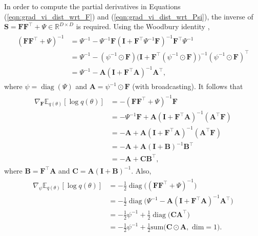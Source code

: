 \documentclass[msc,deptreport.inf]{infthesis} %
\newcommand{\matr}[1]{\mathbf{#1}}
\newcommand{\R}{\mathbb R}
\newcommand{\E}{\mathbb E}
\newcommand{\diag}{\mathop{\mathrm{diag}}}
\begin{document}
In order to compute the partial derivatives in Equations (\ref{eqn:grad_vi_dist_wrt_F}) and (\ref{eqn:grad_vi_dist_wrt_Psi}), the inverse of $\matr{S} = \matr{FF}^{\intercal} + \Psi \in \R^{D \times D}$ is required. Using the Woodbury identity \cite{petersen2012},
\begin{align}
\begin{split}
	( \matr{FF}^{\intercal} + \Psi)^{-1}
	& = \Psi^{-1} - \Psi^{-1}\matr{F}(\matr{I} + \matr{F}^\intercal \Psi^{-1} \matr{F})^{-1} \matr{F}^\intercal \Psi^{-1} \\
	& = \Psi^{-1} - (\psi^{-1} \odot \matr{F}) \big(\matr{I} + \matr{F}^\intercal (\psi^{-1} \odot \matr{F})\big)^{-1} (\psi^{-1} \odot \matr{F})^\intercal \\
	& = \Psi^{-1} - \matr{A} (\matr{I} + \matr{F}^\intercal \matr{A})^{-1} \matr{A}^\intercal,
\end{split}
\end{align}
where $\psi = \diag(\Psi)$ and $\matr{A} = \psi^{-1} \odot \matr{F}$ (with broadcasting). It follows that
\begin{align}
\begin{split}
	\nabla_\matr{F} \E_{q(\theta)} [\log q(\theta)]
	& = -( \matr{FF}^{\intercal} + \Psi)^{-1}\matr{F} \\
	& = -\Psi^{-1} \matr{F}  + \matr{A}  (\matr{I} + \matr{F}^\intercal \matr{A})^{-1} (\matr{A}^\intercal \matr{F}) \\
	& = -\matr{A}  + \matr{A} (\matr{I} + \matr{F}^\intercal \matr{A})^{-1} (\matr{A}^\intercal \matr{F}) \\
	& = -\matr{A}  + \matr{A} (\matr{I} + \matr{B})^{-1} \matr{B}^\intercal \\
	& = -\matr{A}  + \matr{C} \matr{B}^\intercal,
\end{split}
\end{align}
where $\matr{B} = \matr{F}^\intercal \matr{A}$ and $\matr{C} = \matr{A} (\matr{I} + \matr{B})^{-1}$. Also,
\begin{align}
\begin{split}
	\nabla_\psi \E_{q(\theta)} [\log q(\theta)]
	& = -\frac{1}{2} \diag\big( ( \matr{FF}^{\intercal} + \Psi)^{-1}\big) \\
	& = -\frac{1}{2}\diag\big(\Psi^{-1}  - \matr{A}  (\matr{I} + \matr{F}^\intercal \matr{A})^{-1} \matr{A}^\intercal \big) \\
	& = -\frac{1}{2}\psi^{-1} + \frac{1}{2} \diag\big(\matr{C} \matr{A}^\intercal \big) \\
	& = -\frac{1}{2}\psi^{-1} + \frac{1}{2} \text{sum}\big(\matr{C} \odot \matr{A}, \text{ dim} = 1\big).
\end{split}
\end{align}
\end{document}
